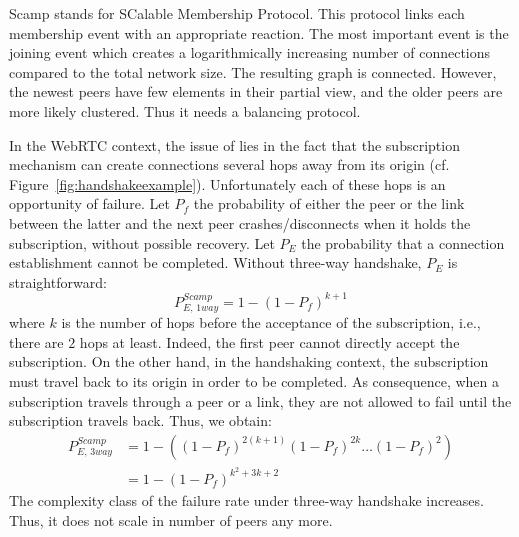 \begin{asparadesc}
\item [Scamp]\cite{ganesh2001scamp,ganesh2003peer} stands for SCalable
  Membership Protocol. This protocol links each membership event with an
  appropriate reaction.  The most important event is the joining event which
  creates a logarithmically increasing number of connections compared to the
  total network size. The resulting graph is connected. However, the newest
  peers have few elements in their partial view, and the older peers are more
  likely clustered. Thus it needs a balancing protocol.

  In the WebRTC context, the issue of \SCAMP{} lies in the fact that the
  subscription mechanism can create connections several hops away from its
  origin (cf. Figure~\ref{fig:handshakeexample}). Unfortunately each of these
  hops is an opportunity of failure. Let $P_f$ the probability of either the
  peer or the link between the latter and the next peer crashes/disconnects
  when it holds the subscription, without possible recovery. Let $P_E$ the
  probability that a connection establishment cannot be completed. Without
  three-way handshake, $P_E$ is straightforward:
  \begin{equation} P_{E,\,1way}^{Scamp}=1-(1- P_f)^{k+1} \end{equation} where
  $k$ is the number of hops before the acceptance of the subscription, i.e.,
  there are $2$ hops at least. Indeed, the first peer cannot directly accept
  the subscription. On the other hand, in the handshaking context, the
  subscription must travel back to its origin in order to be completed. As
  consequence, when a subscription travels through a peer or a link, they are
  not allowed to fail until the subscription travels back. Thus, we obtain:
  \begin{align} P_{E,\,3way}^{Scamp} &=1 - ((1-P_f)^{2(k+1)} (1-P_f)^{2k}
                                       \ldots (1-P_f)^2) \nonumber \\
                                     &=1-(1-P_f)^{k^2+3k+2}
  \end{align}
  The complexity class of the \SCAMP{} failure rate under three-way handshake
  increases. Thus, it does not scale in number of peers any more.
\end{asparadesc}

